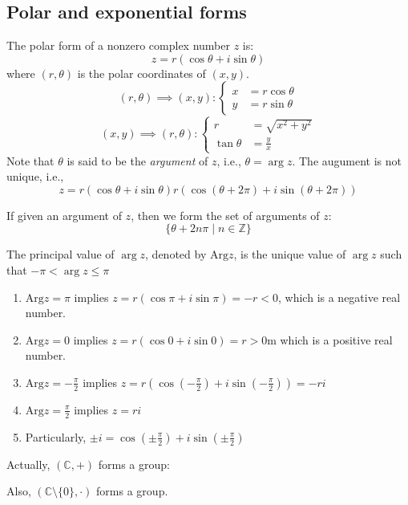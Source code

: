 \subsection{Polar and exponential forms}
\begin{definition}
The polar form of a nonzero complex number $z$ is:
\[
z = r(\cos\theta + i\sin\theta)
\]
where $(r,\theta)$ is the polar coordinates of $(x,y)$.
\[
(r,\theta)\implies (x,y):\left\{
\begin{aligned}
x&=r\cos\theta\\
y&=r\sin\theta
\end{aligned}
\right.
\]
\[
(x,y)\implies (r,\theta):\left\{
\begin{aligned}
r&=\sqrt{x^2+y^2}\\
\tan\theta&=\frac{y}{x}
\end{aligned}
\right.
\]
Note that $\theta$ is said to be the \emph{argument} of $z$, i.e., $\theta=\arg z$. The augument is not unique, i.e.,
\[
z = r(\cos\theta + i\sin\theta) 
 r(\cos(\theta+2\pi) + i\sin(\theta + 2\pi))
\]
\end{definition}
If given an argument of $z$, then we form the set of arguments of $z$:
\[
\{\theta+2n\pi\mid n\in\mathbb{Z}\}
\]
\begin{definition}
The principal value of $\arg z$, denoted by $\mbox{Arg} z$, is the unique value of $\arg z$ such that $-\pi<\arg z\le\pi$
\end{definition}
\begin{example}
\begin{enumerate}
\item
$\mbox{Arg}z=\pi$ implies $z = r(\cos\pi + i\sin\pi) = -r<0$, which is a negative real number.
\item
$\mbox{Arg}z=0$ implies $z=r(\cos0+i\sin0)=r>0$m which is a positive real number.
\item
$\mbox{Arg}z=-\frac{\pi}{2}$ implies $z=r(\cos(-\frac{\pi}{2})+i\sin(-\frac{\pi}{2}))=-ri$
\item
$\mbox{Arg}z = \frac{\pi}{2}$ implies $z = ri$
\item
Particularly, $\pm i = \cos(\pm \frac{\pi}{2}) + i\sin(\pm\frac{\pi}{2})$
\end{enumerate}
\end{example}





Actually, $(\mathbb{C},+)$ forms a group:


Also, $(\mathbb{C}\setminus\{0\},\cdot)$ forms a group.

